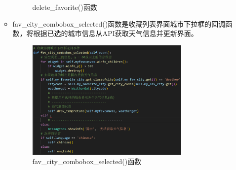 \documentclass[UTF8]{ctexart}
\begin{document}
\begin{enumerate}
\begin{itemize}
\begin{figure}[H]
         \caption{delete\_favorite()函数}
      \end{figure}
      \item fav\_city\_combobox\_selected()函数是收藏列表界面城市下拉框的回调函数，将根据已选的城市信息从API获取天气信息并更新界面。
      \begin{figure}[H]
         \centering
         \includegraphics[width=0.8\textwidth]{pica4.png}
         \caption{fav\_city\_combobox\_selected()函数}
      \end{figure}
   \end{itemize}


\end{enumerate}
\end{document}

